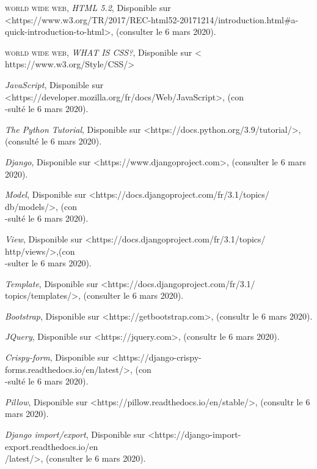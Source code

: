 \begin{thebibliography}{2}
         \textsc{world wide web}, \emph{HTML 5.2}, Disponible sur <https://www.w3.org/TR/2017/REC-html52-20171214/introduction.html#a-quick-introduction-to-html>, (consulter le 6 mars 2020).
        
         \textsc{world wide web}, \emph{WHAT IS CSS?}, Disponible sur < https://www.w3.org/Style/CSS/>
        
          \emph{JavaScript}, Disponible sur <https://developer.mozilla.org/fr/docs/Web/JavaScript>, (con\\-sulté le 6 mars 2020).
        
          \emph{The Python Tutorial}, Disponible sur <https://docs.python.org/3.9/tutorial/>, (consulté le 6 mars 2020).
        
          \emph{Django}, Disponible sur <https://www.djangoproject.com>, (consulter le 6 mars 2020). 
        
          \emph{Model}, Disponible sur <https://docs.djangoproject.com/fr/3.1/topics/
        db/models/>, (con\\-sulté le 6 mars 2020).
        
          \emph{View}, Disponible sur <https://docs.djangoproject.com/fr/3.1/topics/
        http/views/>,(con\\-sulter le 6 mars 2020).
        
         \emph{Template}, Disponible sur <https://docs.djangoproject.com/fr/3.1/
        topics/templates/>, (consulter le 6 mars 2020).
        
         \emph{Bootstrap}, Disponible sur <https://getbootstrap.com>, (consultr le 6 mars 2020).
        
         \emph{JQuery}, Disponible sur <https://jquery.com>, (consultr le 6 mars 2020).
        
         \emph{Crispy-form}, Disponible sur <https://django-crispy-
        forms.readthedocs.io/en/latest/>, (con\\-sulté le 6 mars 2020).
        
         \emph{Pillow}, Disponible sur <https://pillow.readthedocs.io/en/stable/>, (consultr le 6 mars 2020).
        
         \emph{Django import/export}, Disponible sur <https://django-import-
        export.readthedocs.io/en\\/latest/>, (consulter le 6 mars 2020). 
        

\end{thebibliography}
